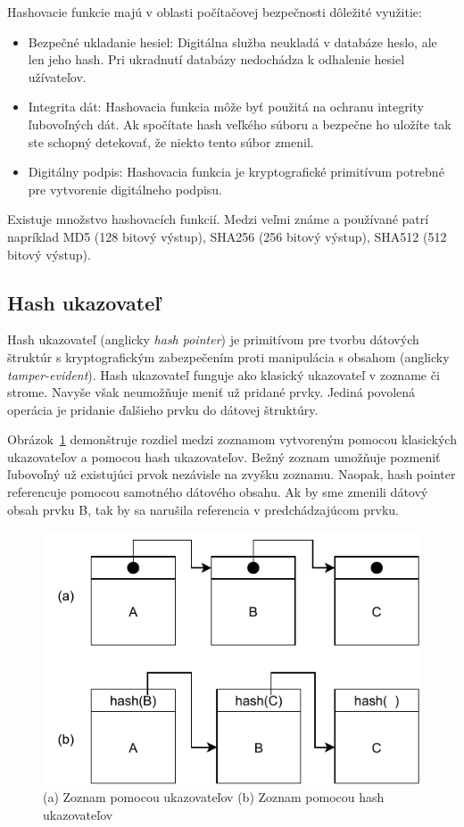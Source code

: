 Hashovacie funkcie majú v oblasti počítačovej bezpečnosti dôležité využitie:
\begin{itemize}
	\item Bezpečné ukladanie hesiel: Digitálna služba neukladá v databáze heslo, ale len jeho hash. Pri ukradnutí databázy nedochádza k odhalenie hesiel užívateľov.
	\item Integrita dát: Hashovacia funkcia môže byť použitá na ochranu integrity ľubovoľných dát. Ak spočítate hash veľkého súboru a bezpečne ho uložíte tak ste schopný detekovať, že niekto tento súbor zmenil.
	\item Digitálny podpis: Hashovacia funkcia je kryptografické primitívum potrebné pre vytvorenie digitálneho podpisu.
\end{itemize}
Existuje množstvo hashovacích funkcií. Medzi veľmi známe a používané patrí napríklad MD5 (128 bitový výstup), SHA256 (256 bitový výstup), SHA512 (512 bitový výstup).~\cite{cryptoHandbook, nigelSmartCrypto}

\subsection{Hash ukazovateľ}\label{subsec:hash-pointer}
Hash ukazovateľ (anglicky \textit{hash pointer}) je primitívom pre tvorbu dátových štruktúr s kryptografickým zabezpečením proti manipulácia s obsahom (anglicky \textit{tamper-evident}). Hash ukazovateľ funguje ako klasický ukazovateľ v zozname či strome. Navyše však neumožňuje meniť už pridané prvky. Jediná povolená operácia je pridanie ďalšieho prvku do dátovej štruktúry. 

Obrázok~\ref{img:hash-pointer} demonštruje rozdiel medzi zoznamom vytvoreným pomocou klasických ukazovateľov a pomocou hash ukazovateľov. Bežný zoznam umožňuje pozmeniť ľubovoľný už existujúci prvok nezávisle na zvyšku zoznamu. Naopak, hash pointer referencuje pomocou samotného dátového obsahu. Ak by sme zmenili dátový obsah prvku B, tak by sa narušila referencia v predchádzajúcom prvku.
~\cite{horizenAcademy, narayanan2016bitcoin}


\begin{figure}[bt]
	\centering
	\includegraphics[width=.6\textwidth]{obrazky-figures/hash-pointer}
	\caption{(a) Zoznam pomocou ukazovateľov \medspace (b) Zoznam pomocou hash ukazovateľov}
	\label{img:hash-pointer}
\end{figure}

